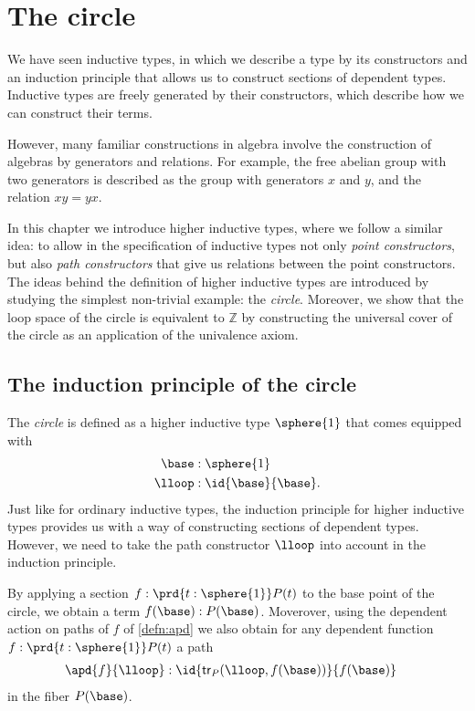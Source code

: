 \chapter{The circle}

We have seen inductive types, in which we describe a type by its constructors and an induction principle that allows us to construct sections of dependent types. Inductive types are freely generated by their constructors, which describe how we can construct their terms. 

However, many familiar constructions in algebra involve the construction of algebras by generators and relations. 
For example, the free abelian group with two generators is described as the group with generators $x$ and $y$, and the relation $xy=yx$. 

In this chapter we introduce higher inductive types, where we follow a similar idea: to allow in the specification of inductive types not only \emph{point constructors}, but also \emph{path constructors} that give us relations between the point constructors. 
The ideas behind the definition of higher inductive types are introduced by studying the simplest non-trivial example: the \emph{circle}.
Moreover, we show that the loop space of the circle is equivalent to $\mathbb{Z}$ by constructing the universal cover of the circle as an application of the univalence axiom. 

\section{The induction principle of the circle}
The \emph{circle} is defined as a higher inductive type $\sphere{1}$ that comes equipped with
\begin{align*}
\base & : \sphere{1} \\
\lloop & : \id{\base}{\base}.
\end{align*}
Just like for ordinary inductive types, the induction principle for higher inductive types provides us with a way of constructing sections of dependent types. However, we need to take the path constructor $\lloop$ into account in the induction principle. 

By applying a section $f:\prd{t:\sphere{1}}P(t)$ to the base point of the circle, we obtain a term $f(\base):P(\base)$. Moverover, using the dependent action on paths of $f$ of \autoref{defn:apd} we also obtain for any dependent function $f:\prd{t:\sphere{1}}P(t)$ a path
\begin{align*}
\apd{f}{\lloop} & : \id{\mathsf{tr}_P(\lloop,f(\base))}{f(\base)}
\end{align*}
in the fiber $P(\base)$.

